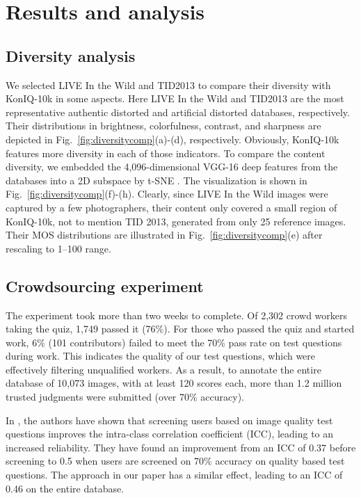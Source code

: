 \documentclass{article}
\begin{document}
\section{Results and analysis}

\subsection{Diversity analysis}





We selected LIVE In the Wild and TID2013 to compare their diversity with KonIQ-10k in some aspects. Here LIVE In the Wild and TID2013 are the most representative authentic distorted and artificial distorted databases, respectively. 
Their distributions in brightness, colorfulness, contrast, and sharpness are depicted in Fig.~\ref{fig:diversitycomp}(a)-(d), respectively. Obviously, KonIQ-10k features more diversity in each of those indicators. To compare the content diversity, we embedded the 4,096-dimensional VGG-16 deep features from the databases into a 2D subspace by t-SNE \cite{van2008visualizing}. The visualization is shown in Fig.~\ref{fig:diversitycomp}(f)-(h). Clearly, since LIVE In the Wild images were captured by a few photographers, their content only covered a small region of KonIQ-10k, not to mention TID 2013, generated from only 25 reference images. Their MOS distributions are illustrated in Fig.~\ref{fig:diversitycomp}(e) after rescaling to 1--100 range.



 





\subsection{Crowdsourcing experiment}

The experiment took more than two weeks to complete. Of 2,302 crowd workers taking the quiz, 1,749 passed it (76\%). For those who passed the quiz and started work, 6\% (101 contributors) failed to meet the 70\% pass rate  on test questions during work. This indicates the quality of our test questions, which were effectively filtering unqualified workers. As a result, to annotate the entire database of 10,073 images, with at least 120 scores each, more than 1.2 million trusted judgments were submitted (over 70\% accuracy). 

In \cite{QoMEXReliability}, the authors have shown that screening users based on image quality test questions improves the intra-class correlation coefficient (ICC), leading to an increased reliability. They have found an improvement from an ICC of 0.37 before screening to 0.5 when users are screened on 70\% accuracy on quality based test questions. The approach in our paper has a similar effect, leading to an ICC of 0.46 on the entire database.
\end{document}

